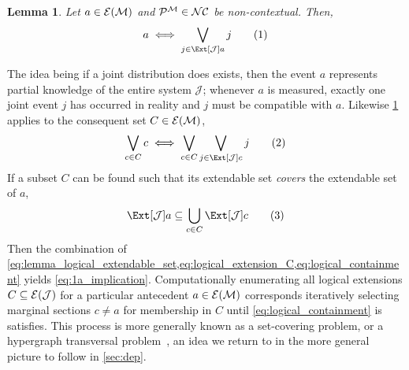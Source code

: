 \documentclass[aps, 10pt, english, twoside, pra, nofootinbib, longbibliography]{revtex4-1}
\theoremstyle{plain}
\newtheorem{lemma}[theorem]{Lemma}
\theoremstyle{definition}
\theoremstyle{remark}
\newcommand{\mscenario}{\mathcal{M}}
\newcommand{\jointvar}{\mathcal{J}}
\newcommand{\Events}[1]{\s{E}\br{#1}} %
\begin{document}
    \begin{lemma}
        \label{lemma:logical_extenable_set}
        Let $a \in \Events{\mscenario}$ and $\probvec^{\mscenario} \in \s{NC}$ be non-contextual. Then,
        \[ a \iff \bigvee_{j \in \Ext[\jointvar]{a}} j \eq \label{eq:lemma_logical_extendable_set}\]
    \end{lemma}
    The idea being if a joint distribution does exists, then the event $a$ represents partial knowledge of the entire system $\jointvar$; whenever $a$ is measured, exactly one joint event $j$ has occurred in reality and $j$ must be compatible with $a$. Likewise \cref{lemma:logical_extenable_set} applies to the consequent set $C \in \Events{\mscenario}$,
    \[ \bigvee_{c \in C} c \iff \bigvee_{c \in C} \bigvee_{j \in \Ext[\jointvar]{c}} j \eq \label{eq:logical_extension_C}\]
    If a subset $C$ can be found such that its extendable set \textit{covers} the extendable set of $a$,
    \[ \Ext[\jointvar]{a} \subseteq \bigcup_{c \in C} \Ext[\jointvar]{c} \eq \label{eq:logical_containment} \]
    Then the combination of \cref{eq:lemma_logical_extendable_set,eq:logical_extension_C,eq:logical_containment} yields \cref{eq:1a_implication}.  Computationally enumerating all logical extensions $C \subseteq \Events{\jointvar}$ for a particular antecedent $a \in \Events{\mscenario}$ corresponds iteratively selecting marginal sections $c \neq a$ for membership in $C$ until \cref{eq:logical_containment} is satisfies. This process is more generally known as a set-covering problem, or a hypergraph transversal problem~\cite{Inflation}, an idea we return to in the more general picture to follow in \cref{sec:dep}. \\
\end{document}
